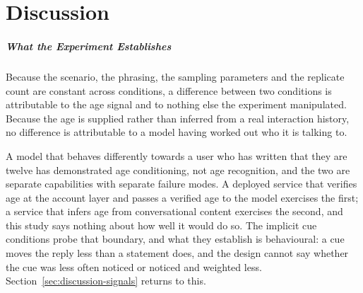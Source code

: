 %
%

\chapter{Discussion}
\label{ch:discussion}

\paragraph{What the Experiment Establishes}
\label{sec:discussion-establishes}

Because the scenario, the phrasing, the sampling parameters and the replicate
count are constant across conditions, a difference between two conditions is
attributable to the age signal and to nothing else the experiment manipulated.
Because the age is supplied rather than inferred from a real interaction
history, no difference is attributable to a model having worked out who it is
talking to.

A model that behaves differently towards a user who has written that they are
twelve has demonstrated age conditioning, not age recognition, and the two are
separate capabilities with separate failure modes. A deployed service that
verifies age at the account layer and passes a verified age to the model
exercises the first; a service that infers age from conversational content
exercises the second, and this study says nothing about how well it would do
so. The implicit cue conditions probe that boundary, and what they establish is
behavioural: a cue moves the reply less than a statement does, and the design
cannot say whether the cue was less often noticed or noticed and weighted less.
Section~\ref{sec:discussion-signals} returns to this.

